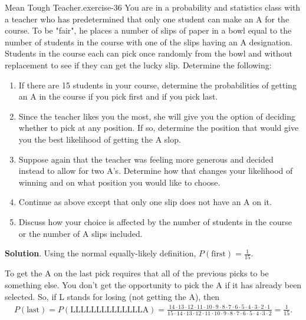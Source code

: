 \documentclass[10pt,]{book}
\numberwithin{equation}{section}
\begin{document}
\begin{inlineexercise}{Mean Tough Teacher.}{exercise-36}%
\hypertarget{p-607}{}%
You are in a probability and statistics class with a teacher who has predetermined that only one student can make an A for the course. To be "fair", he places a number of slips of paper in a bowl equal to the number of students in the course with one of the slips having an A designation. Students in the course each can pick once randomly from the bowl and without replacement to see if they can get the lucky slip.  Determine the following: \leavevmode%
\begin{enumerate}
\item\hypertarget{li-163}{}If there are 15 students in your course, determine the probabilities of getting an A in the course if you pick first and if you pick last.%
\item\hypertarget{li-164}{}Since the teacher likes you the most, she will give you the option of deciding whether to pick at any position. If so, determine the position that would give you the best likelihood of getting the A slop.%
\item\hypertarget{li-165}{}Suppose again that the teacher was feeling more generous and decided instead to allow for two A's. Determine how that changes your likelihood of winning and on what position you would like to choose.%
\item\hypertarget{li-166}{}Continue as above except that only one slip does not have an A on it.%
\item\hypertarget{li-167}{}Discuss how your choice is affected by the number of students in the course or the number of A slips included.%
\end{enumerate}
%
\par\smallskip%
\noindent\textbf{Solution}.\hypertarget{solution-14}{}\quad%
\hypertarget{p-608}{}%
Using the normal equally-likely definition, \(P(\text{first}) = \frac{1}{15}\).%
\par
\hypertarget{p-609}{}%
To get the A on the last pick requires that all of the previous picks to be something else. You don't get the opportunity to pick the A if it has already been selected. So, if L stands for losing (not getting the A), then%
\begin{gather*}
P(\text{last}) = P(\text{LLLLLLLLLLLLLLA}) = \frac{14 \cdot 13 \cdot 12 \cdot 11 \cdot 10 \cdot 9  \cdot 8  \cdot 7  \cdot 6  \cdot 5  \cdot 4  \cdot 3 \cdot 2  \cdot 1}{15 \cdot 14 \cdot 13 \cdot 12 \cdot 11 \cdot 10 \cdot 9 \cdot 8 \cdot 7 \cdot 6 \cdot 5 \cdot 4 \cdot 3 \cdot 2} = \frac{1}{15}.

\end{gather*}
\end{inlineexercise}
\end{document}
